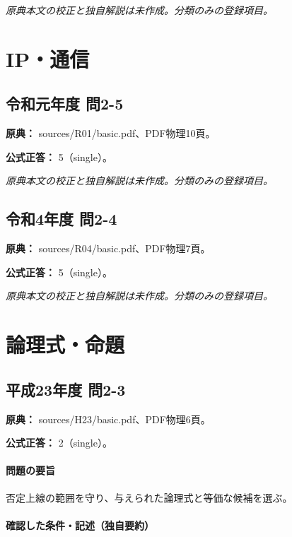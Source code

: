\par\textit{原典本文の校正と独自解説は未作成。分類のみの登録項目。}

\section{IP・通信}

\subsection{令和元年度 問2-5}
\label{q:r01-reg-basic-2-5}

\noindent\textbf{原典：} sources/R01/basic.pdf、PDF物理10頁。

\textbf{公式正答：} 5（single）。

\par\textit{原典本文の校正と独自解説は未作成。分類のみの登録項目。}

\subsection{令和4年度 問2-4}
\label{q:r04-reg-basic-2-4}

\noindent\textbf{原典：} sources/R04/basic.pdf、PDF物理7頁。

\textbf{公式正答：} 5（single）。

\par\textit{原典本文の校正と独自解説は未作成。分類のみの登録項目。}

\section{論理式・命題}

\subsection{平成23年度 問2-3}
\label{q:h23-reg-basic-2-3}

\noindent\textbf{原典：} sources/H23/basic.pdf、PDF物理6頁。

\textbf{公式正答：} 2（single）。

\paragraph{問題の要旨} 否定上線の範囲を守り、与えられた論理式と等価な候補を選ぶ。

\paragraph{確認した条件・記述（独自要約）}\mbox{}\par

